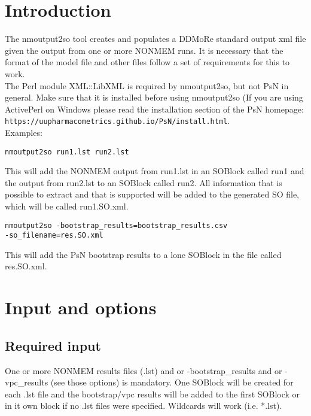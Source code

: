 
\usepackage{hyperref}


\maketitle
\tableofcontents
\newpage
\section{Introduction}
The nmoutput2so tool creates and populates a DDMoRe standard output \cite{Terranova} xml file given the output from one or more NONMEM runs. It is necessary that the format of the model file and other files follow a set of requirements for this to work. \\
The Perl module XML::LibXML is required by nmoutput2so, but not PsN in general. Make sure that it is installed before using nmoutput2so (If you are using ActivePerl on Windows please read the installation section of the PsN homepage:
\texttt{https://uupharmacometrics.github.io/PsN/install.html}.\\ 
Examples:
\begin{verbatim}
nmoutput2so run1.lst run2.lst
\end{verbatim}
This will add the NONMEM output from run1.lst in an SOBlock called run1 and the output from run2.lst to an SOBlock called run2. All information that is possible to extract and that is supported will be added to the generated SO file, which will be called run1.SO.xml. 
\begin{verbatim}
nmoutput2so -bootstrap_results=bootstrap_results.csv
-so_filename=res.SO.xml
\end{verbatim}
This will add the PsN bootstrap results to a lone SOBlock in the file called res.SO.xml.
\section{Input and options}

\subsection{Required input}
One or more NONMEM results files (.lst) and or -bootstrap\_results and or -vpc\_results (see those options) is mandatory. One SOBlock will be created for each .lst file and the bootstrap/vpc results will be added to the first SOBlock or in it 
own block if no .lst files were specified. Wildcards will work (i.e. *.lst).


